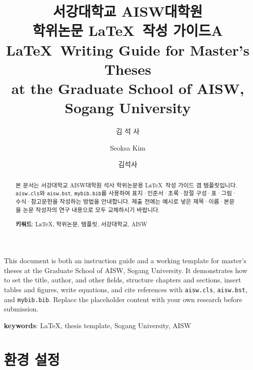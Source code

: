 \documentclass[korean]{aisw}
\title[korean]{서강대학교 AI\textbullet SW대학원 \\ 학위논문 \LaTeX\ 작성 가이드}
\title[english]{A \LaTeX\ Writing Guide for Master's Theses \\ at the Graduate School of AI\textbullet SW, Sogang University}
\author[korean]{김 석 사} %
\author[english]{Seoksa Kim}
\author[nospace]{김석사} %
\begin{document}
\renewcommand{\baselinestretch}{1.6}    %
\selectfont


\newpage
\makelists

\begin{summary}
    \par
    This document is both an instruction guide and a working template for
    master's theses at the Graduate School of AI\textbullet SW, Sogang University.
    It demonstrates how to set the title, author, and other fields, structure chapters and sections,
    insert tables and figures, write equations, and cite references with
    \texttt{aisw.cls}, \texttt{aisw.bst}, and \texttt{mybib.bib}.
    Replace the placeholder content with your own research before submission.
    \vfill
    \begin{minipage}[t][20mm][b]{\textwidth}
        {\bfseries keywords}: \LaTeX, thesis template, Sogang University, AI\textbullet SW\\
    \end{minipage}
\end{summary}

\newpage

\begin{abstract}
    \par
    본 문서는 서강대학교 AI\textbullet SW대학원 석사 학위논문용
    \LaTeX\ 작성 가이드 겸 템플릿입니다.
    \texttt{aisw.cls}와 \texttt{aisw.bst}, \texttt{mybib.bib}를 사용하여
    표지·인준서·초록·장절 구성·표·그림·수식·참고문헌을 작성하는 방법을 안내합니다.
    제출 전에는 예시로 넣은 제목·이름·본문을 논문 작성자의 연구 내용으로 모두 교체하시기 바랍니다.
    \vfill
    \begin{minipage}[t][20mm][b]{\textwidth}
        {\bfseries 키워드}: \LaTeX, 학위논문, 템플릿, 서강대학교, AI\textbullet SW\\
    \end{minipage}
\end{abstract}

\chapter{환경 설정}
\end{document}

